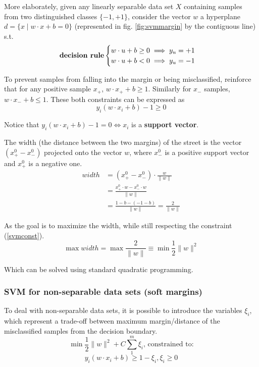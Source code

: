 More elaborately, given any linearly separable data set $X$ containing samples from two distinguished classes $\{-1, +1\}$, consider the vector $w$ a hyperplane $d = \{x \mid w \cdot x + b = 0\}$ (represented in fig. \ref{fig:svmmargin} by the contiguous line) s.t.
$$\text{\textbf{decision rule}} \begin{cases}
	w \cdot u +b \geq 0 \implies y_u=+1\\
	w \cdot u +b < 0 \implies y_u=-1\\
\end{cases}$$

To prevent samples from falling into the margin or being misclassified, \cite{wessvmdef} reinforce that for any positive sample $x_+$, $w \cdot x_+ +b \geq 1$. Similarly for $x_-$ samples, $w \cdot x_- +b \leq 1$. These both constraints can be expressed as
\begin{equation} \label{svmconst}
y_i(w \cdot x_i +b) -1 \geq 0
\end{equation}

Notice that $y_i(w \cdot x_i +b) -1 = 0 \iff x_i $ is a \textbf{support vector}.

The width (the distance between the two margins) of the street is the vector $(x_+^0 -x_-^0)$ projected onto the vector $w$, where $x_-^0$ is a positive support vector and $x_+^0$ is a negative one.
\begin{equation} \label{eq:eqsvmwidth}
\begin{split}
width &= (x_+^0 - x_-^0) \cdot \frac{w}{\|w\|} \\
      &=\frac{x_+^0 \cdot w - x_-^0 \cdot w}{\|w\|} \\
      &=\frac{1-b - (-1-b)}{\|w\|} = \frac{2}{\|w\|}
\end{split}
\end{equation}

As the goal is to maximize the width, while still respecting the constraint (\ref{svmconst}).
\begin{equation} \label{eq:svmminw}
	\max width = \max \frac{2}{\|w\|} \equiv \min \frac{1}{2} \|w\|^2
\end{equation}

Which can be solved using standard quadratic programming.

\subsubsection{SVM for non-separable data sets (soft margins)}

To deal with non-separable data sets, it is possible to introduce the variables $\xi_i$, \cite{wessvmdef} which represent a trade-off between maximum margin/distance of the misclassified samples from the decision boundary.
$$\min \frac{1}{2} \|w\|^2 + C \sum_{1}^{m}\xi_i \text{, constrained to:}$$
$$y_i(w \cdot x_i +b) \geq 1- \xi_i, \xi_i \geq 0$$

